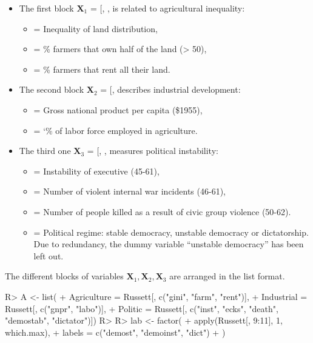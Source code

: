\documentclass[
]{jss}
\providecommand{\tightlist}{%
  \setlength{\itemsep}{0pt}\setlength{\parskip}{0pt}}
\begin{document}
\begin{itemize}
\tightlist
\item
  The first block \(\mathbf{X}_1\) = {[}, ,
  \code{rent}{]} is related to agricultural inequality:

  \begin{itemize}
  \tightlist
  \item
     = Inequality of land distribution,
  \item
     = \% farmers that own half of the land (\textgreater{}
    50),
  \item
     = \% farmers that rent all their land.
  \end{itemize}
\item
  The second block \(\mathbf{X}_2\) = {[}, \code{labo}{]}
  describes industrial development:

  \begin{itemize}
  \tightlist
  \item
     = Gross national product per capita (\$1955),
  \item
     = `\% of labor force employed in agriculture.
  \end{itemize}
\item
  The third one \(\mathbf{X}_3\) = {[}, ,
  \code{death}{]} measures political instability:

  \begin{itemize}
  \tightlist
  \item
     = Instability of executive (45-61),
  \item
     = Number of violent internal war incidents (46-61),
  \item
     = Number of people killed as a result of civic group
    violence (50-62).
  \item
     = Political regime: stable democracy, unstable democracy
    or dictatorship. Due to redundancy, the dummy variable ``unstable
    democracy'' has been left out.
  \end{itemize}
\end{itemize}

The different blocks of variables
\(\mathbf X_1, \mathbf X_2, \mathbf X_3\) are arranged in the list
format.

\footnotesize

\begin{CodeChunk}
\begin{CodeInput}
R> A <- list(
+   Agriculture = Russett[, c("gini", "farm", "rent")],
+   Industrial = Russett[, c("gnpr", "labo")],
+   Politic = Russett[, c("inst", "ecks",  "death", "demostab", "dictator")])
R> 
R> lab <- factor(
+   apply(Russett[, 9:11], 1, which.max),
+   labels = c("demost", "demoinst", "dict")
+ )
\end{CodeInput}
\end{CodeChunk}
\end{document}
